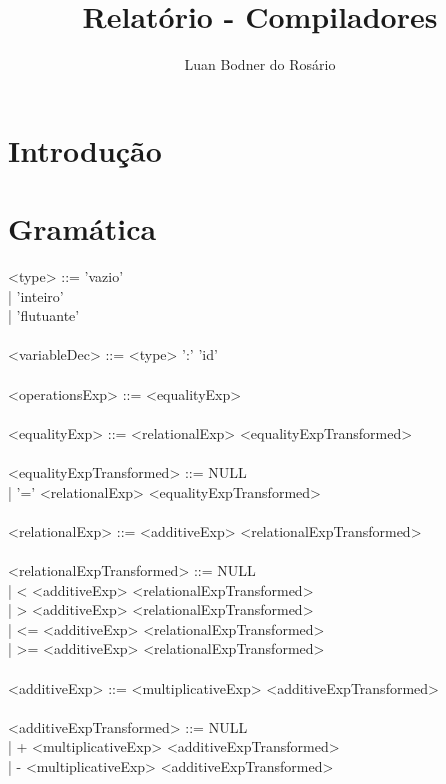 \documentclass[12pt,a4paper,final]{report}
\author{Luan Bodner do Rosário}
\title{Relatório - Compiladores}
\newcommand\tab[1][1cm]{\hspace*{#1}}
\begin{document}
\maketitle
\section*{Introdução}

\newpage
\section*{Gramática}

<type> ::= 'vazio'\\
\tab\tab | 'inteiro'\\
\tab\tab | 'flutuante'\\
\\
<variableDec> ::= <type> ':' 'id' \\
\\
<operationsExp> ::= <equalityExp>\\
\\
<equalityExp> ::= <relationalExp> <equalityExpTransformed>\\
\\
<equalityExpTransformed> ::= NULL\\
\tab\tab\tab\tab\tab | '=' <relationalExp> <equalityExpTransformed>\\
\\
<relationalExp> ::= <additiveExp> <relationalExpTransformed>\\
\\
<relationalExpTransformed> ::= NULL\\
\tab \tab \tab \tab \tab| < <additiveExp> <relationalExpTransformed>\\
\tab \tab \tab \tab \tab| > <additiveExp> <relationalExpTransformed>\\
\tab \tab \tab \tab \tab| <= <additiveExp> <relationalExpTransformed>\\
\tab \tab \tab \tab \tab| >= <additiveExp> <relationalExpTransformed>\\
\\
<additiveExp> ::= <multiplicativeExp> <additiveExpTransformed>\\
\\
<additiveExpTransformed> ::= NULL\\
\tab \tab \tab \tab \tab| + <multiplicativeExp> <additiveExpTransformed>\\
\tab \tab \tab \tab \tab| - <multiplicativeExp> <additiveExpTransformed> \\		
\end{document}
